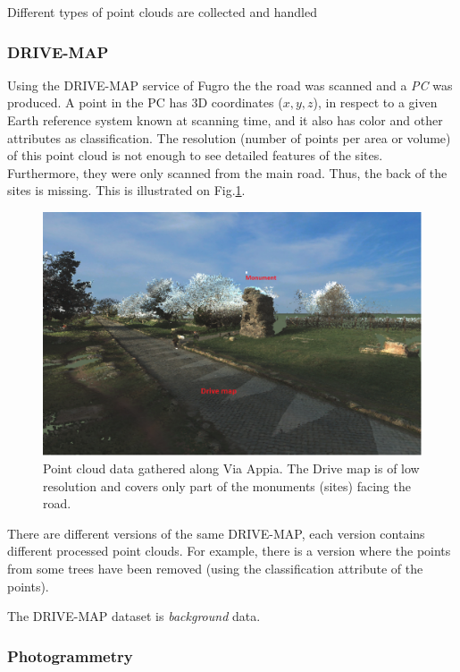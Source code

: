Different types of point clouds are collected and handled

\subsubsection{DRIVE-MAP}

Using the DRIVE-MAP service of Fugro the the road was scanned and a
{\em PC} was produced. A point in the PC has 3D coordinates ($x, y, z$), in
respect to a given Earth reference system known at scanning time, and it also has color and
other attributes as classification. The resolution (number of points per area
or volume) of this point cloud is not enough to see detailed features of the
sites. Furthermore, they were only scanned from the main road. Thus, the back
of the sites is missing. This is illustrated on Fig.\ref{fig:viaAppiaPointCloud}.

\begin{figure}[!ht] \centering
\includegraphics[scale=0.5]{fig/conceptual_description/ViaAppiaPCAnnot.pdf}
\caption{Point cloud data gathered along Via Appia. The Drive map is of low
resolution and covers only part of the monuments (sites) facing the road.}
\label{fig:viaAppiaPointCloud} \end{figure}

There are different versions of the same DRIVE-MAP, each version contains different processed point clouds. For example, there is a version where the points from some trees have been removed (using the classification attribute of the points).

The DRIVE-MAP dataset is \textit{background} data.

\subsubsection{Photogrammetry}

